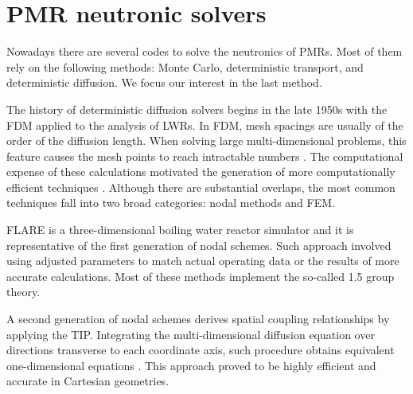 \documentclass[11pt,letterpaper]{article}
\begin{document}
\section{\gls{PMR} neutronic solvers}

Nowadays there are several codes to solve the neutronics of \glspl{PMR}.
Most of them rely on the following methods: Monte Carlo, deterministic transport, and deterministic diffusion.
We focus our interest in the last method.

The history of deterministic diffusion solvers begins in the late 1950s with the \gls{FDM} applied to the analysis of \glspl{LWR}.
In \gls{FDM}, mesh spacings are usually of the order of the diffusion length.
When solving large multi-dimensional problems, this feature causes the mesh points to reach intractable numbers \cite{lewis_finite_1986}.
The computational expense of these calculations motivated the generation of more computationally efficient techniques \cite{lawrence_progress_1986}.
Although there are substantial overlaps, the most common techniques fall into two broad categories: nodal methods and \gls{FEM}.

FLARE \cite{delp_flare_1964} is a three-dimensional boiling water reactor simulator and it is representative of the first generation of nodal schemes.
Such approach involved using adjusted parameters to match actual operating data or the results of more accurate calculations. 
Most of these methods implement the so-called 1.5 group theory.

A second generation of nodal schemes derives spatial coupling relationships by applying the \gls{TIP}.
Integrating the multi-dimensional diffusion equation over directions transverse to each coordinate axis, such procedure obtains equivalent one-dimensional equations \cite{lawrence_progress_1986}.
This approach proved to be highly efficient and accurate in Cartesian geometries.
\end{document}
